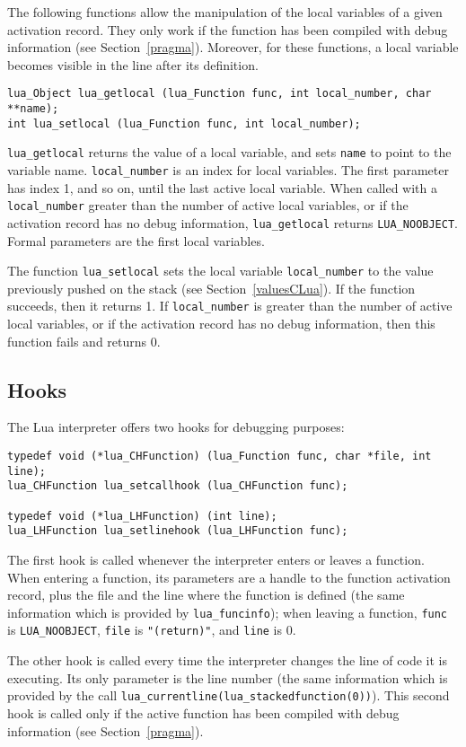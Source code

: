 \documentclass[11pt]{article}
\newcommand{\See}[1]{Section~\ref{#1}}
\newcommand{\see}[1]{(see \See{#1})}
\begin{document}
The following functions allow the manipulation of the
local variables of a given activation record.
They only work if the function has been compiled with debug
information \see{pragma}.
Moreover, for these functions, a local variable becomes
visible in the line after its definition. 
\begin{verbatim}
lua_Object lua_getlocal (lua_Function func, int local_number, char **name);
int lua_setlocal (lua_Function func, int local_number);
\end{verbatim}
\verb|lua_getlocal| returns the value of a local variable,
and sets \verb|name| to point to the variable name.
\verb|local_number| is an index for local variables.
The first parameter has index 1, and so on, until the
last active local variable.
When called with a \verb|local_number| greater than the
number of active local variables,
or if the activation record has no debug information,
\verb|lua_getlocal| returns \verb|LUA_NOOBJECT|.
Formal parameters are the first local variables.

The function \verb|lua_setlocal| sets the local variable
\verb|local_number| to the value previously pushed on the stack
\see{valuesCLua}.
If the function succeeds, then it returns 1.
If \verb|local_number| is greater than the number
of active local variables,
or if the activation record has no debug information,
then this function fails and returns 0.

\subsection{Hooks}

The Lua interpreter offers two hooks for debugging purposes:
\begin{verbatim}
typedef void (*lua_CHFunction) (lua_Function func, char *file, int line);
lua_CHFunction lua_setcallhook (lua_CHFunction func);

typedef void (*lua_LHFunction) (int line);
lua_LHFunction lua_setlinehook (lua_LHFunction func);
\end{verbatim}
The first hook is called whenever the interpreter enters or leaves a
function.
When entering a function,
its parameters are a handle to the function activation record,
plus the file and the line where the function is defined
(the same information which is provided by \verb|lua_funcinfo|);
when leaving a function, \verb|func| is \verb|LUA_NOOBJECT|,
\verb|file| is \verb|"(return)"|, and \verb|line| is 0.

The other hook is called every time the interpreter changes
the line of code it is executing.
Its only parameter is the line number
(the same information which is provided by the call
\verb|lua_currentline(lua_stackedfunction(0))|).
This second hook is called only if the active function
has been compiled with debug information \see{pragma}.
\end{document}
